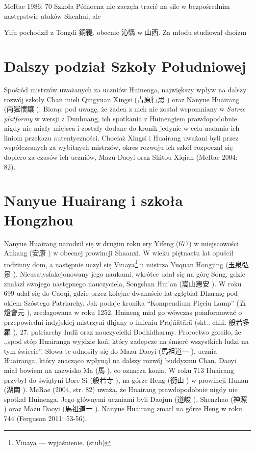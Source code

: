 McRae 1986: 70
Szkoła Północna nie zaczęła tracić na sile w bezpośrednim następstwie ataków Shenhui, ale

Yifu pochodził z Tongdi 銅鞮, obecnie 沁縣 w 山西.
Za młodu studiował daoizm
\fi

\section{Dalszy podział Szkoły Południowej}
Spośród mistrzów uważanych za uczniów Huinenga, największy wpływ na dalszy rozwój szkoły Chan mieli Qingyuan Xingsi (青原行思 ) oraz Nanyue Huairang (南嶽懷讓 ).
Biorąc pod uwagę, że żaden z nich nie został wspomniany w \textit{Sutrze platformy} w wersji z Dunhuang, ich spotkania z Huinengiem prawdopodobnie nigdy nie miały miejsca i zostały dodane do kronik jedynie w celu nadania ich liniom przekazu autentyczności.
Chociaż Xingsi i Huairang uważani byli przez współczesnych za wybitnych mistrzów, okres rozwoju ich szkół rozpoczął się dopiero za czasów ich uczniów, Mazu Daoyi oraz Shitou Xiqian %
(McRae 2004: 82).

\section{Nanyue Huairang i szkoła Hongzhou}
Nanyue Huairang narodził się w drugim roku ery Yifeng (677) w miejscowości Ankang (安康 ) w obecnej prowincji Shaanxi.
W wieku piętnastu lat opuścił rodzinny dom, a następnie uczył się Vinaya\footnote{Vinaya --- wyjaśnienie. (stub)} u mistrza Yuquan Hongjing (玉泉弘景 ).
Nieusatysfakcjonowany jego naukami, wkrótce udał się na górę Song, gdzie znalazł swojego następnego nauczyciela, Songshan Hui'an (嵩山惠安 ).
W roku 699 udał się do Caoqi, gdzie przez kolejne dwanaście lat zgłębiał Dharmę pod okiem Szóstego Patriarchy.
Jak podaje kronika ``Kompendium Pięciu Lamp'' (五燈會元 ), zredagowana w roku 1252, Huineng miał go wówczas poinformować o przepowiedni indyjskiej mistrzyni dhjany o imieniu Prajñātārā (skt., chiń. 般若多羅 ), 27. patriarchy Indii oraz nauczycielki Bodhidharmy.
Proroctwo głosiło, że ,,spod stóp Huairanga wyjdzie koń, który zadepcze na śmierć wszystkich ludzi na tym świecie''.
Słowa te odnosiły się do Mazu Daoyi (馬祖道一 ), ucznia Huairanga, który znacząco wpłynął na dalszy rozwój buddyzmu Chan.
Daoyi miał bowiem na nazwisko Ma (馬 ), co oznacza konia.
W roku 713 Huairang przybył do świątyni Bore Si (般若寺 ), na górze Heng (衡山 ) w prowincji Hunan (湖南 ).
McRae (2004, str. 82) uważa, że Huairang prawdopodobnie nigdy nie spotkał Huinenga.
Jego głównymi uczniami byli Daojun (道峻 ), Shenzhao (神照 ) oraz Mazu Daoyi (馬祖道一 ).
Nanyue Huairang zmarł na górze Heng w roku 744
(Ferguson 2011: 53-56).

